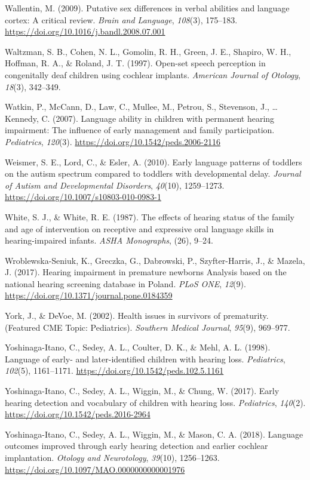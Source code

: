 \documentclass[english,man]{apa6}
\begin{document}
\leavevmode\hypertarget{ref-wallentin2009}{}%
Wallentin, M. (2009). Putative sex differences in verbal abilities and language cortex: A critical review. \emph{Brain and Language}, \emph{108}(3), 175--183. \url{https://doi.org/10.1016/j.bandl.2008.07.001}

\leavevmode\hypertarget{ref-waltzman1997}{}%
Waltzman, S. B., Cohen, N. L., Gomolin, R. H., Green, J. E., Shapiro, W. H., Hoffman, R. A., \& Roland, J. T. (1997). Open-set speech perception in congenitally deaf children using cochlear implants. \emph{American Journal of Otology}, \emph{18}(3), 342--349.

\leavevmode\hypertarget{ref-watkin2007}{}%
Watkin, P., McCann, D., Law, C., Mullee, M., Petrou, S., Stevenson, J., \ldots{} Kennedy, C. (2007). Language ability in children with permanent hearing impairment: The influence of early management and family participation. \emph{Pediatrics}, \emph{120}(3). \url{https://doi.org/10.1542/peds.2006-2116}

\leavevmode\hypertarget{ref-weismer2010}{}%
Weismer, S. E., Lord, C., \& Esler, A. (2010). Early language patterns of toddlers on the autism spectrum compared to toddlers with developmental delay. \emph{Journal of Autism and Developmental Disorders}, \emph{40}(10), 1259--1273. \url{https://doi.org/10.1007/s10803-010-0983-1}

\leavevmode\hypertarget{ref-white1987}{}%
White, S. J., \& White, R. E. (1987). The effects of hearing status of the family and age of intervention on receptive and expressive oral language skills in hearing-impaired infants. \emph{ASHA Monographs}, (26), 9--24.

\leavevmode\hypertarget{ref-wroblewska-seniuk2017}{}%
Wroblewska-Seniuk, K., Greczka, G., Dabrowski, P., Szyfter-Harris, J., \& Mazela, J. (2017). Hearing impairment in premature newborns Analysis based on the national hearing screening database in Poland. \emph{PLoS ONE}, \emph{12}(9). \url{https://doi.org/10.1371/journal.pone.0184359}

\leavevmode\hypertarget{ref-york2002}{}%
York, J., \& DeVoe, M. (2002). Health issues in survivors of prematurity. (Featured CME Topic: Pediatrics). \emph{Southern Medical Journal}, \emph{95}(9), 969--977.

\leavevmode\hypertarget{ref-yoshinaga-itano1998}{}%
Yoshinaga-Itano, C., Sedey, A. L., Coulter, D. K., \& Mehl, A. L. (1998). Language of early- and later-identified children with hearing loss. \emph{Pediatrics}, \emph{102}(5), 1161--1171. \url{https://doi.org/10.1542/peds.102.5.1161}

\leavevmode\hypertarget{ref-yoshinaga-itano2017}{}%
Yoshinaga-Itano, C., Sedey, A. L., Wiggin, M., \& Chung, W. (2017). Early hearing detection and vocabulary of children with hearing loss. \emph{Pediatrics}, \emph{140}(2). \url{https://doi.org/10.1542/peds.2016-2964}

\leavevmode\hypertarget{ref-yoshinaga-itano2018}{}%
Yoshinaga-Itano, C., Sedey, A. L., Wiggin, M., \& Mason, C. A. (2018). Language outcomes improved through early hearing detection and earlier cochlear implantation. \emph{Otology and Neurotology}, \emph{39}(10), 1256--1263. \url{https://doi.org/10.1097/MAO.0000000000001976}
\end{document}
